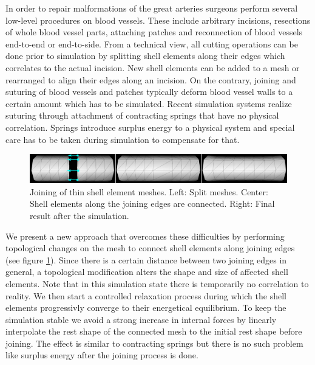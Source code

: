 In order to repair malformations of the great arteries surgeons perform several low-level procedures on blood vessels. These include arbitrary incisions, resections of whole blood vessel parts, attaching patches and reconnection of blood vessels end-to-end or end-to-side. From a technical view, all cutting operations can be done prior to simulation by splitting shell elements along their edges which correlates to the actual incision. New shell elements can be added to a mesh or rearranged to align their edges along an incision. On the contrary, joining and suturing of blood vessels and patches typically deform blood vessel walls to a certain amount which has to be simulated. Recent simulation systems \cite{Sorensen2006,Mosegaard2004,Li2009} realize suturing through attachment of contracting springs that have no physical correlation. Springs introduce surplus energy to a physical system and special care has to be taken during simulation to compensate for that.

\begin{figure}[tbh]
\begin{center}
\includegraphics[width=\columnwidth]{img/new-joining.png}
\end{center}
\caption{Joining of thin shell element meshes. Left: Split meshes. Center: Shell elements along the joining edges are connected. Right: Final result after the simulation.}
\label{fig-JoiningVessels}
\end{figure}

We present a new approach that overcomes these difficulties by performing topological changes on the mesh to connect shell elements along joining edges (see figure \ref{fig-JoiningVessels}). Since there is a certain distance between two joining edges in general, a topological modification alters the shape and size of affected shell elements. Note that in this simulation state there is temporarily no correlation to reality. We then start a controlled relaxation process during which the shell elements progressivly converge to their energetical equilibrium. To keep the simulation stable we avoid a strong increase in internal forces by linearly interpolate the rest shape of the connected mesh to the initial rest shape before joining. The effect is similar to contracting springs but there is no such problem like surplus energy after the joining process is done.

